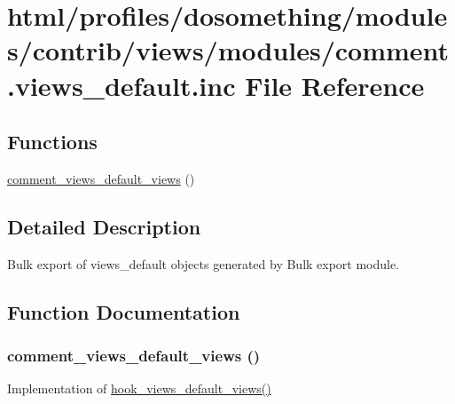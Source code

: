 \hypertarget{comment_8views__default_8inc}{
\section{html/profiles/dosomething/modules/contrib/views/modules/comment.views\_\-default.inc File Reference}
\label{comment_8views__default_8inc}
}
\subsection*{Functions}
\begin{DoxyCompactItemize}
\item 
\hyperlink{comment_8views__default_8inc_ac97518afe3b53c9d547af9c49733a229}{comment\_\-views\_\-default\_\-views} ()
\end{DoxyCompactItemize}


\subsection{Detailed Description}
Bulk export of views\_\-default objects generated by Bulk export module. 

\subsection{Function Documentation}
\hypertarget{comment_8views__default_8inc_ac97518afe3b53c9d547af9c49733a229}{
\subsubsection[{comment\_\-views\_\-default\_\-views}]{\setlength{\rightskip}{0pt plus 5cm}comment\_\-views\_\-default\_\-views ()}}
\label{comment_8views__default_8inc_ac97518afe3b53c9d547af9c49733a229}
Implementation of \hyperlink{group__views__hooks_ga23edb74860682fa88f75cf94b97c2e15}{hook\_\-views\_\-default\_\-views()} 